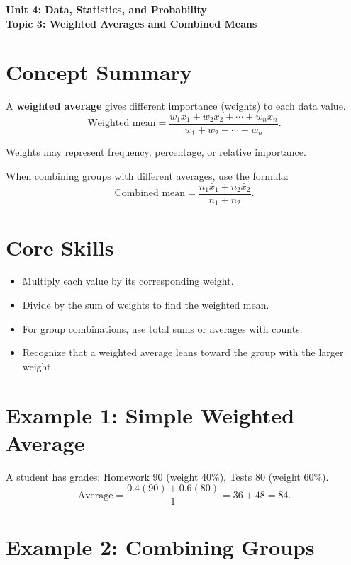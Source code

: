 \documentclass[12pt]{article}
\begin{document}
\begin{center}
    \LARGE \textbf{Unit 4: Data, Statistics, and Probability} \\[6pt]
    \Large \textbf{Topic 3: Weighted Averages and Combined Means}
\end{center}

\vspace{1em}

\section*{Concept Summary}

A \textbf{weighted average} gives different importance (weights) to each data value.  
\[
\text{Weighted mean} = \frac{w_1x_1 + w_2x_2 + \cdots + w_nx_n}{w_1 + w_2 + \cdots + w_n}.
\]

Weights may represent frequency, percentage, or relative importance.

When combining groups with different averages, use the formula:
\[
\text{Combined mean} = \frac{n_1\bar{x}_1 + n_2\bar{x}_2}{n_1 + n_2}.
\]

\section*{Core Skills}
\begin{itemize}
  \item Multiply each value by its corresponding weight.
  \item Divide by the sum of weights to find the weighted mean.
  \item For group combinations, use total sums or averages with counts.
  \item Recognize that a weighted average leans toward the group with the larger weight.
\end{itemize}

\section*{Example 1: Simple Weighted Average}

A student has grades:  
Homework 90 (weight 40\%), Tests 80 (weight 60\%).  
\[
\text{Average} = \frac{0.4(90)+0.6(80)}{1} = 36 + 48 = \boxed{84}.
\]

\section*{Example 2: Combining Groups}
\end{document}
